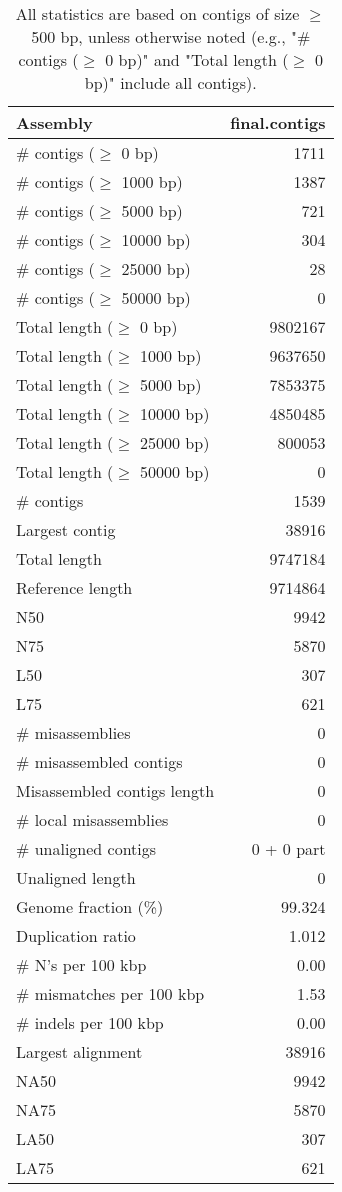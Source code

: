 \documentclass[12pt,a4paper]{article}
\begin{document}
\begin{table}[ht]
\begin{center}
\caption{All statistics are based on contigs of size $\geq$ 500 bp, unless otherwise noted (e.g., "\# contigs ($\geq$ 0 bp)" and "Total length ($\geq$ 0 bp)" include all contigs).}
\begin{tabular}{|l*{1}{|r}|}
\hline
Assembly & final.contigs \\ \hline
\# contigs ($\geq$ 0 bp) & 1711 \\ \hline
\# contigs ($\geq$ 1000 bp) & 1387 \\ \hline
\# contigs ($\geq$ 5000 bp) & 721 \\ \hline
\# contigs ($\geq$ 10000 bp) & 304 \\ \hline
\# contigs ($\geq$ 25000 bp) & 28 \\ \hline
\# contigs ($\geq$ 50000 bp) & 0 \\ \hline
Total length ($\geq$ 0 bp) & 9802167 \\ \hline
Total length ($\geq$ 1000 bp) & 9637650 \\ \hline
Total length ($\geq$ 5000 bp) & 7853375 \\ \hline
Total length ($\geq$ 10000 bp) & 4850485 \\ \hline
Total length ($\geq$ 25000 bp) & 800053 \\ \hline
Total length ($\geq$ 50000 bp) & 0 \\ \hline
\# contigs & 1539 \\ \hline
Largest contig & 38916 \\ \hline
Total length & 9747184 \\ \hline
Reference length & 9714864 \\ \hline
N50 & 9942 \\ \hline
N75 & 5870 \\ \hline
L50 & 307 \\ \hline
L75 & 621 \\ \hline
\# misassemblies & 0 \\ \hline
\# misassembled contigs & 0 \\ \hline
Misassembled contigs length & 0 \\ \hline
\# local misassemblies & 0 \\ \hline
\# unaligned contigs & 0 + 0 part \\ \hline
Unaligned length & 0 \\ \hline
Genome fraction (\%) & 99.324 \\ \hline
Duplication ratio & 1.012 \\ \hline
\# N's per 100 kbp & 0.00 \\ \hline
\# mismatches per 100 kbp & 1.53 \\ \hline
\# indels per 100 kbp & 0.00 \\ \hline
Largest alignment & 38916 \\ \hline
NA50 & 9942 \\ \hline
NA75 & 5870 \\ \hline
LA50 & 307 \\ \hline
LA75 & 621 \\ \hline
\end{tabular}
\end{center}
\end{table}
\end{document}
